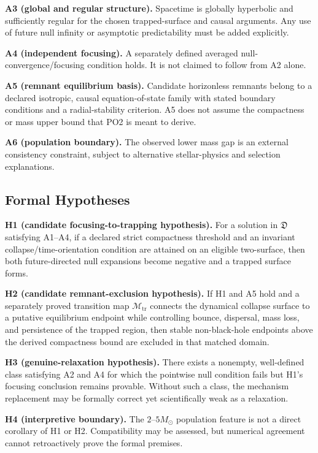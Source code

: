\documentclass[conference]{IEEEtran}
\newcommand{\Msun}{M_{\odot}}
\begin{document}
\textbf{A3 (global and regular structure).} Spacetime is globally hyperbolic and sufficiently regular for the chosen trapped-surface and causal arguments. Any use of future null infinity or asymptotic predictability must be added explicitly.

\textbf{A4 (independent focusing).} A separately defined averaged null-convergence/focusing condition holds. It is not claimed to follow from A2 alone.

\textbf{A5 (remnant equilibrium basis).} Candidate horizonless remnants belong to a declared isotropic, causal equation-of-state family with stated boundary conditions and a radial-stability criterion. A5 does not assume the compactness or mass upper bound that PO2 is meant to derive.

\textbf{A6 (population boundary).} The observed lower mass gap is an external consistency constraint, subject to alternative stellar-physics and selection explanations.

\subsection{Formal Hypotheses}
\textbf{H1 (candidate focusing-to-trapping hypothesis).} For a solution in $\mathfrak{D}$ satisfying A1--A4, if a declared strict compactness threshold and an invariant collapse/time-orientation condition are attained on an eligible two-surface, then both future-directed null expansions become negative and a trapped surface forms.

\textbf{H2 (candidate remnant-exclusion hypothesis).} If H1 and A5 hold and a separately proved transition map $\mathcal{M}_{\mathrm{tr}}$ connects the dynamical collapse surface to a putative equilibrium endpoint while controlling bounce, dispersal, mass loss, and persistence of the trapped region, then stable non-black-hole endpoints above the derived compactness bound are excluded in that matched domain.

\textbf{H3 (genuine-relaxation hypothesis).} There exists a nonempty, well-defined class satisfying A2 and A4 for which the pointwise null condition fails but H1's focusing conclusion remains provable. Without such a class, the mechanism replacement may be formally correct yet scientifically weak as a relaxation.

\textbf{H4 (interpretive boundary).} The $2$--$5\Msun$ population feature is not a direct corollary of H1 or H2. Compatibility may be assessed, but numerical agreement cannot retroactively prove the formal premises.
\end{document}
